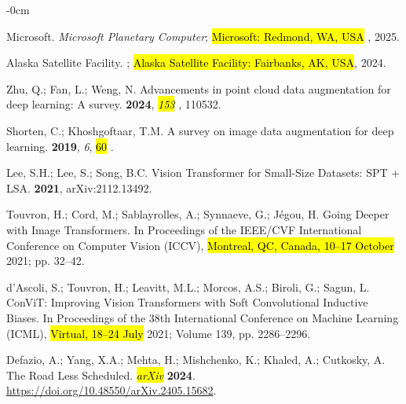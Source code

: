 \documentclass[remotesensing,article,accept,pdftex,moreauthors]{Definitions/mdpi}
\begin{document}
\begin{adjustwidth}{-\extralength}{0cm}
\begin{thebibliography}{999}
Microsoft.
\newblock \emph{Microsoft {Planetary} {Computer}}; \hl{Microsoft: Redmond, WA, USA}%
, 2025.

{Alaska Satellite Facility}.
; \hl{Alaska Satellite Facility: Fairbanks, AK, USA}, 2024.

Zhu, Q.; Fan, L.; Weng, N.
\newblock Advancements in point cloud data augmentation for deep learning: A
  survey.
 {\bf 2024}, \emph{\hl{153}%
}, 110532.

Shorten, C.; Khoshgoftaar, T.M.
\newblock A survey on image data augmentation for deep learning.
 {\bf 2019}, {\em 6}, \hl{60}%
.

Lee, S.H.; Lee, S.; Song, B.C.
\newblock Vision Transformer for Small-Size Datasets: {SPT + LSA}.
 {\bf 2021}, arXiv:2112.13492.

Touvron, H.; Cord, M.; Sablayrolles, A.; Synnaeve, G.; J{\'e}gou, H.
\newblock Going Deeper with Image Transformers.
\newblock In Proceedings of the IEEE/CVF International
  Conference on Computer Vision (ICCV), \hl{Montreal, QC, Canada, 10--17 October} 2021; pp. 32--42.

d'Ascoli, S.; Touvron, H.; Leavitt, M.L.; Morcos, A.S.; Biroli, G.; Sagun, L.
\newblock ConViT: Improving Vision Transformers with Soft Convolutional
  Inductive Biases.
\newblock In Proceedings of the 38th International
  Conference on Machine Learning (ICML), \hl{Virtual, 18--24 July} 2021; Volume 139, pp. 2286--2296.

Defazio, A.; Yang, X.A.; Mehta, H.; Mishchenko, K.; Khaled, A.; Cutkosky, A.
\newblock The Road Less Scheduled. \emph{\hl{arXiv} %
} \textbf{2024}.
  {\url{https://doi.org/10.48550/arXiv.2405.15682}}.


\end{thebibliography}
\end{adjustwidth}
\end{document}
